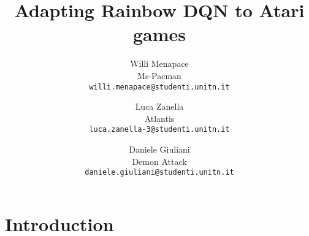\documentclass[10pt,twocolumn,letterpaper]{article}
\begin{document}
\title{Adapting Rainbow DQN to Atari games}

\author{Willi Menapace\\
Ms-Pacman\\
{\tt\small willi.menapace@studenti.unitn.it}
\and
Luca Zanella\\
Atlantis\\
{\tt\small luca.zanella-3@studenti.unitn.it}
\and
Daniele Giuliani\\
Demon Attack\\
{\tt\small daniele.giuliani@studenti.unitn.it}
}

\maketitle



\section{Introduction}
\end{document}
